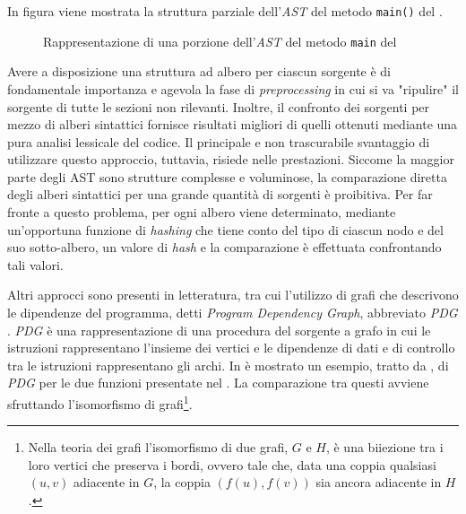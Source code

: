 In figura  viene mostrata la struttura parziale dell'\textit{AST} del metodo \texttt{main()} del .

\begin{figure}
    \caption{Rappresentazione di una porzione dell'\textit{AST} del metodo \texttt{main} del }
    \label{img:01-ast}
\end{figure}

Avere a disposizione una struttura ad albero per ciascun sorgente è di fondamentale importanza e agevola la fase di \textit{preprocessing} in cui si va "ripulire" il sorgente di tutte le sezioni non rilevanti.
%
Inoltre, il confronto dei sorgenti per mezzo di alberi sintattici fornisce risultati migliori di quelli ottenuti mediante una pura analisi lessicale del codice.
%
Il principale e non trascurabile svantaggio di utilizzare questo approccio, tuttavia, risiede nelle prestazioni.
%
Siccome la maggior parte degli AST sono strutture complesse e voluminose, la comparazione diretta degli alberi sintattici per una grande quantità di sorgenti è proibitiva.
%
Per far fronte a questo problema, per ogni albero viene determinato, mediante un'opportuna funzione di \textit{hashing} che tiene conto del tipo di ciascun nodo e del suo sotto-albero, un valore di \textit{hash} e la comparazione è effettuata confrontando tali valori.

Altri approcci sono presenti in letteratura, tra cui l'utilizzo di grafi che descrivono le dipendenze del programma, detti \textit{Program Dependency Graph}, abbreviato \textit{PDG} \cite{gplag}.
%
\textit{PDG} è una rappresentazione di una procedura del sorgente a grafo in cui le istruzioni rappresentano l'insieme dei vertici e le dipendenze di dati e di controllo tra le istruzioni rappresentano gli archi.
%
In  è mostrato un esempio, tratto da \cite{gplag}, di \textit{PDG} per le due funzioni presentate nel .
%
La comparazione tra questi avviene sfruttando l'isomorfismo di grafi\footnote{Nella teoria dei grafi l'isomorfismo di due grafi, $G$ e $H$, è una biiezione tra i loro vertici che preserva i bordi, ovvero tale che, data una coppia qualsiasi $(u, v)$ adiacente in $G$, la coppia $(f(u), f(v))$ sia ancora adiacente in $H$.}.

